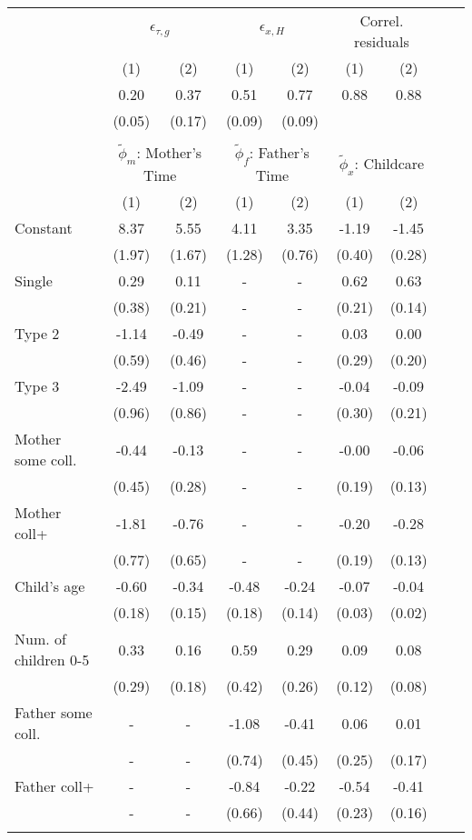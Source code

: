 \begin{tabular}{lcccccccc}\\\toprule
 & \multicolumn{2}{c}{$\epsilon_{\tau,g}$} & \multicolumn{2}{c}{$\epsilon_{x,H}$} & \multicolumn{2}{c}{Correl. residuals}\\
&(1)&(2)&(1)&(2)&(1)&(2)\\\cmidrule(r){2-3}\cmidrule(r){4-5}\cmidrule(r){6-7}
&0.20&0.37&0.51&0.77&0.88&0.88&&\\
&(0.05)&(0.17)&(0.09)&(0.09)&&&&\\
&&&&&&\\
 & \multicolumn{2}{c}{$\tilde{\phi}_{m}$: Mother's Time} & \multicolumn{2}{c}{$\tilde{\phi}_{f}$: Father's Time} & \multicolumn{2}{c}{$\tilde{\phi}_{x}$: Childcare}\\
&(1)&(2)&(1)&(2)&(1)&(2)\\\cmidrule(r){2-3}\cmidrule(r){4-5}\cmidrule(r){6-7}
Constant&8.37&5.55&4.11&3.35&-1.19&-1.45\\
&(1.97)&(1.67)&(1.28)&(0.76)&(0.40)&(0.28)\\
Single&0.29&0.11&-&-&0.62&0.63\\
&(0.38)&(0.21)&-&-&(0.21)&(0.14)\\
Type 2&-1.14&-0.49&-&-&0.03&0.00\\
&(0.59)&(0.46)&-&-&(0.29)&(0.20)\\
Type 3&-2.49&-1.09&-&-&-0.04&-0.09\\
&(0.96)&(0.86)&-&-&(0.30)&(0.21)\\
Mother some coll.&-0.44&-0.13&-&-&-0.00&-0.06\\
&(0.45)&(0.28)&-&-&(0.19)&(0.13)\\
Mother coll+&-1.81&-0.76&-&-&-0.20&-0.28\\
&(0.77)&(0.65)&-&-&(0.19)&(0.13)\\
Child's age&-0.60&-0.34&-0.48&-0.24&-0.07&-0.04\\
&(0.18)&(0.15)&(0.18)&(0.14)&(0.03)&(0.02)\\
Num. of children 0-5&0.33&0.16&0.59&0.29&0.09&0.08\\
&(0.29)&(0.18)&(0.42)&(0.26)&(0.12)&(0.08)\\
Father some coll.&-&-&-1.08&-0.41&0.06&0.01\\
&-&-&(0.74)&(0.45)&(0.25)&(0.17)\\
Father coll+&-&-&-0.84&-0.22&-0.54&-0.41\\
&-&-&(0.66)&(0.44)&(0.23)&(0.16)\\
\\
\bottomrule\end{tabular}